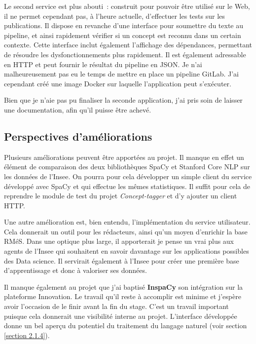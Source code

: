 Le second service est plus abouti~: construit pour pouvoir être utilisé sur le Web, il ne permet cependant pas, à l'heure actuelle, d'effectuer les tests sur les publications. Il dispose en revanche d'une interface pour soumettre du texte au pipeline, et ainsi rapidement vérifier si un concept est reconnu dans un certain contexte. Cette interface inclut également l'affichage des dépendances, permettant de résoudre les dysfonctionnements plus rapidement. Il est également adressable en HTTP et peut fournir le résultat du pipeline en JSON. Je n'ai malheureusement pas eu le temps de mettre en place un pipeline GitLab. J'ai cependant créé une image Docker sur laquelle l'application peut s'exécuter.
\newline

Bien que je n'aie pas pu finaliser la seconde application, j'ai pris soin de laisser une documentation, afin qu'il puisse être achevé. 

\subsection{Perspectives d'améliorations}

Plusieurs améliorations peuvent être apportées au projet. Il manque en effet un élément de comparaison des deux bibliothèques SpaCy et Stanford Core NLP sur les données de l'Insee. On pourra pour cela développer un simple client du service développé avec SpaCy et qui effectue les mêmes statistiques. Il suffit pour cela de reprendre le module de test du projet \textit{Concept-tagger} et d'y ajouter un client HTTP.
\newline

Une autre amélioration est, bien entendu, l'implémentation du service utilisateur. Cela donnerait un outil pour les rédacteurs, ainsi qu'un moyen d'enrichir la base RMéS. Dans une optique plus large, il apporterait je pense un vrai plus aux agents de l'Insee qui souhaitent en savoir davantage sur les applications possibles des Data science. Il servirait également à l'Insee pour créer une première base d'apprentissage et donc à valoriser ses données.
\newline

Il manque également au projet que j'ai baptisé \textbf{InspaCy} son intégration sur la plateforme Innovation. Le travail qu'il reste à accomplir est minime et j'espère avoir l'occasion de le finir avant la fin du stage. C'est un travail important puisque cela donnerait une visibilité interne au projet. L'interface développée donne un bel aperçu du potentiel du traitement du langage naturel (voir section \ref{section 2.1.4}).
\newline


